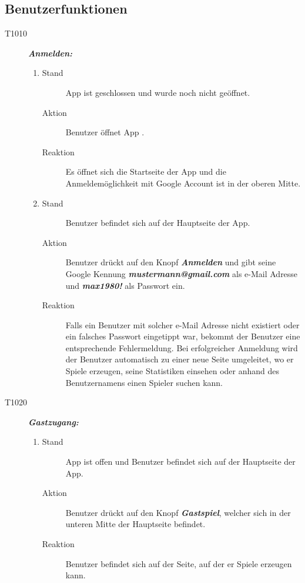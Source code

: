 \documentclass[parskip=full]{scrartcl}
\begin{document}
	\subsection{Benutzerfunktionen}
	\begin{description}
		\item[T1010] \textbf{\textit{Anmelden: }} \\
		\begin{enumerate}
			\item 
			\begin{description}
				\item[Stand] App ist geschlossen und wurde noch nicht geöffnet.
				\item[Aktion] Benutzer öffnet App .
				\item[Reaktion] Es öffnet sich die Startseite der App und die Anmeldemöglichkeit mit Google Account  ist in der oberen Mitte.
			\end{description} 
			\item 
			\begin{description}
				\item[Stand] Benutzer befindet sich auf der Hauptseite der App.
				\item[Aktion] Benutzer drückt auf den Knopf \textit{\textbf{Anmelden}} und gibt seine Google Kennung  \textit{\textbf{mustermann@gmail.com }}als  e-Mail Adresse und \textit{\textbf{max1980!}} als Passwort ein.
				\item[Reaktion]
				Falls ein Benutzer mit solcher e-Mail Adresse nicht existiert oder ein falsches Passwort eingetippt war, bekommt der Benutzer eine entsprechende Fehlermeldung. Bei erfolgreicher Anmeldung wird der Benutzer  automatisch zu einer neue Seite umgeleitet, wo er Spiele erzeugen, seine Statistiken einsehen oder anhand des Benutzernamens einen Spieler suchen kann.
			\end{description}
			
		\end{enumerate}
		
		\item[T1020]  \textbf{\textit{Gastzugang: }} 
		\begin{enumerate}
			\item 
			\begin{description}
				\item[Stand] App ist offen und Benutzer befindet sich auf der Hauptseite der App.
				\item[Aktion] Benutzer drückt auf den Knopf \textbf{\textit{Gastspiel}}, welcher sich in der unteren Mitte der Hauptseite befindet.
				\item[Reaktion] Benutzer befindet sich auf der Seite, auf der er Spiele erzeugen kann.
			\end{description} 
			

\end{enumerate}
\end{description}
\end{document}
